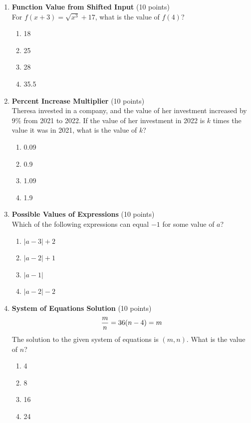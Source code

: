 \begin{enumerate}
  \newpage

  \item \textbf{Function Value from Shifted Input} (10 points)\\
  For $f(x+3)=\sqrt{x^3}+17$, what is the value of $f(4)$?
  \begin{enumerate}[label=(\Alph*)]
    \item 18
    \item 25
    \item 28
    \item 35.5
  \end{enumerate}
  \begin{subanswer}
  \end{subanswer}

  \item \textbf{Percent Increase Multiplier} (10 points)\\
  Theresa invested in a company, and the value of her investment increased by $9\%$ from 2021 to 2022. If the value of her investment in 2022 is $k$ times the value it was in 2021, what is the value of $k$?
  \begin{enumerate}[label=(\Alph*)]
    \item 0.09
    \item 0.9
    \item 1.09
    \item 1.9
  \end{enumerate}
  \begin{subanswer}
  \end{subanswer}

  \item \textbf{Possible Values of Expressions} (10 points)\\
  Which of the following expressions can equal $-1$ for some value of $a$?
  \begin{enumerate}[label=(\Alph*)]
    \item $|a-3|+2$
    \item $|a-2|+1$
    \item $|a-1|$
    \item $|a-2|-2$
  \end{enumerate}
  \begin{subanswer}
  \end{subanswer}


  \newpage

  \item \textbf{System of Equations Solution} (10 points)\\
  \[
    \frac{m}{n}=3 \\
    6(n-4)=m
  \]
  The solution to the given system of equations is $(m, n)$. What is the value of $n$?
  \begin{enumerate}[label=(\Alph*)]
    \item 4
    \item 8
    \item 16
    \item 24
  \end{enumerate}
  \begin{subanswer}
  \end{subanswer}


\end{enumerate}
